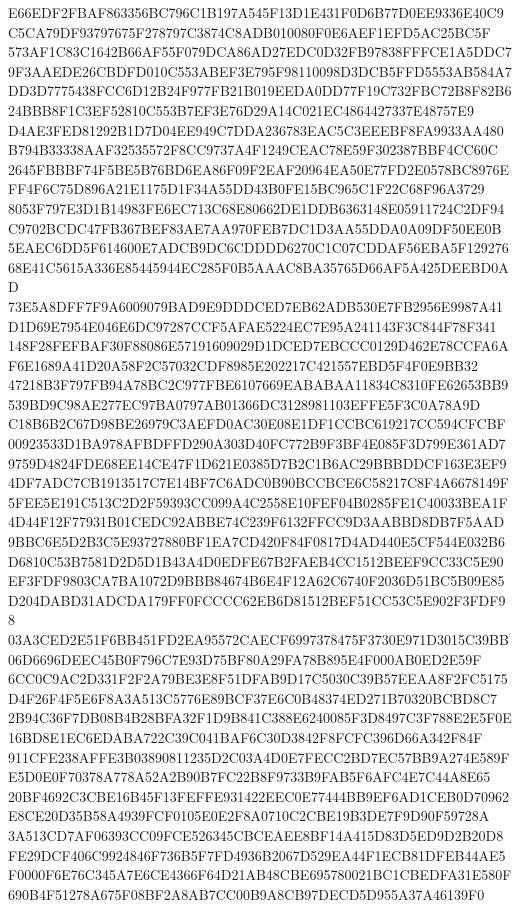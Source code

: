 \documentclass[UTF8,fontset=fandol,zihao=-4,a4paper]{ctexart}
\begin{document}
{{E66EDF2FBAF863356BC796C1B197A545F13D1E431F0D6B77D0EE9336E40C9C5CA79DF93797675F278797C3874C8ADB010080F0E6AEF1EFD5AC25BC5F
573AF1C83C1642B66AF55F079DCA86AD27EDC0D32FB97838FFFCE1A5DDC79F3AAEDE26CBDFD010C553ABEF3E795F98110098D3DCB5FFD5553AB584A7
DD3D7775438FCC6D12B24F977FB21B019EEDA0DD77F19C732FBC72B8F82B624BBB8F1C3EF52810C553B7EF3E76D29A14C021EC4864427337E48757E9
D4AE3FED81292B1D7D04EE949C7DDA236783EAC5C3EEEBF8FA9933AA480B794B33338AAF32535572F8CC9737A4F1249CEAC78E59F302387BBF4CC60C
2645FBBBF74F5BE5B76BD6EA86F09F2EAF20964EA50E77FD2E0578BC8976EFF4F6C75D896A21E1175D1F34A55DD43B0FE15BC965C1F22C68F96A3729
8053F797E3D1B14983FE6EC713C68E80662DE1DDB6363148E05911724C2DF94C9702BCDC47FB367BEF83AE7AA970FEB7DC1D3AA55DDA0A09DF50EE0B
5EAEC6DD5F614600E7ADCB9DC6CDDDD6270C1C07CDDAF56EBA5F12927668E41C5615A336E85445944EC285F0B5AAAC8BA35765D66AF5A425DEEBD0AD
73E5A8DFF7F9A6009079BAD9E9DDDCED7EB62ADB530E7FB2956E9987A41D1D69E7954E046E6DC97287CCF5AFAE5224EC7E95A241143F3C844F78F341
148F28FEFBAF30F88086E57191609029D1DCED7EBCCC0129D462E78CCFA6AF6E1689A41D20A58F2C57032CDF8985E202217C421557EBD5F4F0E9BB32
47218B3F797FB94A78BC2C977FBE6107669EABABAA11834C8310FE62653BB9539BD9C98AE277EC97BA0797AB01366DC3128981103EFFE5F3C0A78A9D
C18B6B2C67D98BE26979C3AEFD0AC30E08E1DF1CCBC619217CC594CFCBF00923533D1BA978AFBDFFD290A303D40FC772B9F3BF4E085F3D799E361AD7
9759D4824FDE68EE14CE47F1D621E0385D7B2C1B6AC29BBBDDCF163E3EF94DF7ADC7CB1913517C7E14BF7C6ADC0B90BCCBCE6C58217C8F4A6678149F
5FEE5E191C513C2D2F59393CC099A4C2558E10FEF04B0285FE1C40033BEA1F4D44F12F77931B01CEDC92ABBE74C239F6132FFCC9D3AABBD8DB7F5AAD
9BBC6E5D2B3C5E93727880BF1EA7CD420F84F0817D4AD440E5CF544E032B6D6810C53B7581D2D5D1B43A4D0EDFE67B2FAEB4CC1512BEEF9CC33C5E90
EF3FDF9803CA7BA1072D9BBB84674B6E4F12A62C6740F2036D51BC5B09E85D204DABD31ADCDA179FF0FCCCC62EB6D81512BEF51CC53C5E902F3FDF98
03A3CED2E51F6BB451FD2EA95572CAECF6997378475F3730E971D3015C39BB06D6696DEEC45B0F796C7E93D75BF80A29FA78B895E4F000AB0ED2E59F
6CC0C9AC2D331F2F2A79BE3E8F51DFAB9D17C5030C39B57EEAA8F2FC5175D4F26F4F5E6F8A3A513C5776E89BCF37E6C0B48374ED271B70320BCBD8C7
2B94C36F7DB08B4B28BFA32F1D9B841C388E6240085F3D8497C3F788E2E5F0E16BD8E1EC6EDABA722C39C041BAF6C30D3842F8FCFC396D66A342F84F
911CFE238AFFE3B03890811235D2C03A4D0E7FECC2BD7EC57BB9A274E589FE5D0E0F70378A778A52A2B90B7FC22B8F9733B9FAB5F6AFC4E7C44A8E65
20BF4692C3CBE16B45F13FEFFE931422EEC0E77444BB9EF6AD1CEB0D70962E8CE20D35B58A4939FCF0105E0E2F8A0710C2CBE19B3DE7F9D90F59728A
3A513CD7AF06393CC09FCE526345CBCEAEE8BF14A415D83D5ED9D2B20D8FE29DCF406C9924846F736B5F7FD4936B2067D529EA44F1ECB81DFEB44AE5
F0000F6E76C345A7E6CE4366F64D21AB48CBE695780021BC1CBEDFA31E580F690B4F51278A675F08BF2A8AB7CC00B9A8CB97DECD5D955A37A46139F0
}}
\end{document}
